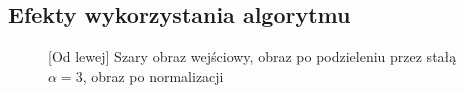\documentclass[a4paper,12pt, titlepage]{report}
\begin{document}
\subsection*{Efekty wykorzystania algorytmu}
\begin{figure}[h]
    \centering
    \caption{[Od lewej] Szary obraz wejściowy, obraz po podzieleniu przez stałą \(\alpha=3\), obraz po normalizacji}%
    \label{fig:rysunek}%
\end{figure}
\FloatBarrier
\end{document}
